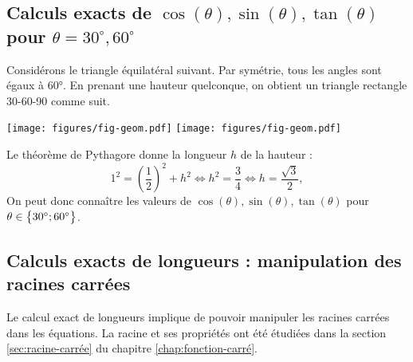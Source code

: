 \subsection{Calculs exacts de $\cos(\theta), \sin(\theta), \tan(\theta)$ pour $\theta=30^\circ, 60^\circ$}

Considérons le triangle équilatéral suivant.
Par symétrie, tous les angles sont égaux à 60°.
En prenant une hauteur quelconque, on obtient un triangle rectangle 30-60-90 comme suit.

	\begin{center}
	\texttt{[image: figures/fig-geom.pdf]}
	\hspace{4cm}
	\texttt{[image: figures/fig-geom.pdf]}
	\end{center}

Le théorème de Pythagore donne la longueur $h$ de la hauteur : 
	\[ 1^2 = \left(\dfrac12\right)^2 + h^2 \iff h^2 = \dfrac34 \iff h = \dfrac{\sqrt3}2, \]
On peut donc connaître les valeurs de $\cos(\theta), \sin(\theta), \tan(\theta)$ pour $\theta\in\bigl\{  30^\circ ; 60^\circ \bigr\}$.




\subsection{Calculs exacts de longueurs : manipulation des racines carrées}

Le calcul exact de longueurs implique de pouvoir manipuler les racines carrées dans les équations.
La racine et ses propriétés ont été étudiées dans la section \ref{sec:racine-carrée} du chapitre \ref{chap:fonction-carré}.

